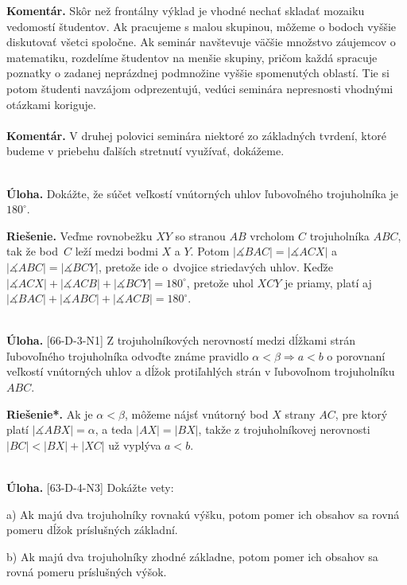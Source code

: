 \documentclass[11pt,a4paper,oneside,final]{book}
\newcommand{\kom}{\textbf{Komentár.} }
\newcommand{\ul}{\textbf{Úloha.} }
\newcommand{\rie}{\textbf{Riešenie.} }
\newcommand{\rieh}{\textbf{Riešenie*.} }
\newcommand{\ma}{\measuredangle}
\begin{document}
\kom Skôr než frontálny výklad je vhodné nechať skladať mozaiku vedomostí študentov. Ak pracujeme s malou skupinou, môžeme o bodoch vyššie diskutovať všetci spoločne. Ak seminár navštevuje väčšie množstvo záujemcov o matematiku, rozdelíme študentov na menšie skupiny, pričom každá spracuje poznatky o zadanej neprázdnej podmnožine vyššie spomenutých oblastí. Tie si potom študenti navzájom odprezentujú, vedúci seminára nepresnosti vhodnými otázkami koriguje. \\
\\
\kom V druhej polovici seminára niektoré zo základných tvrdení, ktoré budeme v priebehu ďalších stretnutí využívať, dokážeme.\\
\\
\begin{tcolorbox}[breakable,notitle,boxrule=0pt,colback=light-gray,colframe=light-gray]\ul Dokážte, že súčet veľkostí vnútorných uhlov ľubovoľného trojuholníka je $180^\circ$.

\end{tcolorbox}

\rie Veďme rovnobežku $XY$ so stranou $AB$ vrcholom $C$ trojuholníka $ABC$, tak že bod~$C$ leží medzi bodmi $X$ a $Y$. Potom $|\ma BAC|=|\ma ACX|$ a $|\ma ABC|=|\ma BCY|$, pretože ide o~dvojice striedavých uhlov. Keďže $|\ma ACX|+|\ma ACB|+ |\ma BCY|=180^\circ$, pretože uhol $XCY$ je priamy, platí aj $|\ma BAC|+|\ma ABC|+|\ma ACB|=180^\circ$.\\
\\
\begin{tcolorbox}[breakable,notitle,boxrule=0pt,colback=light-gray,colframe=light-gray]\ul [66-D-3-N1] Z trojuholníkových nerovností medzi dĺžkami strán ľubovoľného trojuholníka odvoďte známe
pravidlo $\alpha < \beta \Rightarrow a < b$ o porovnaní veľkostí vnútorných uhlov a dĺžok protiľahlých strán v ľubovoľnom trojuholníku $ABC$.

\end{tcolorbox}

\rieh Ak je $\alpha  < \beta$, môžeme nájsť vnútorný bod $X$ strany $AC$, pre ktorý platí $|\ma ABX| = \alpha$, a teda $|AX| = |BX|$, takže z trojuholníkovej nerovnosti $|BC| < |BX| + |XC|$ už vyplýva $a < b$.\\
\\
\begin{tcolorbox}[breakable,notitle,boxrule=0pt,colback=light-gray,colframe=light-gray]\ul [63-D-4-N3] Dokážte vety:

a) Ak majú dva trojuholníky rovnakú výšku, potom pomer ich obsahov sa rovná pomeru dĺžok príslušných základní.

b) Ak majú dva trojuholníky zhodné základne, potom pomer ich obsahov sa rovná pomeru príslušných výšok.

\end{tcolorbox}
\end{document}
